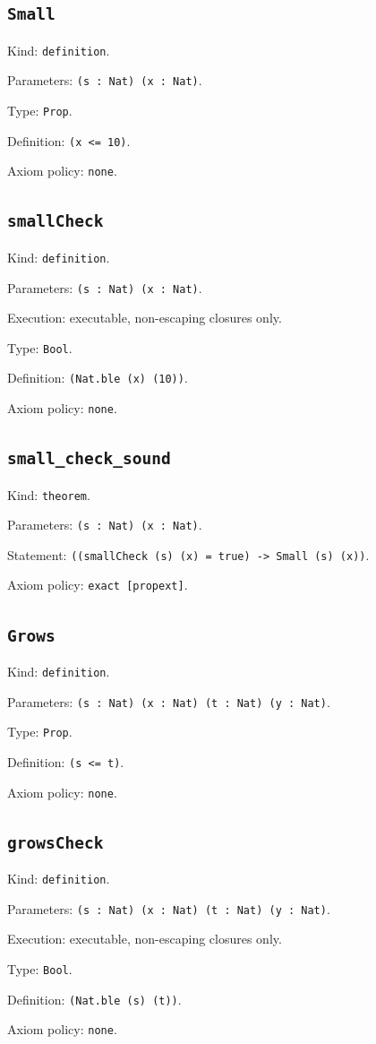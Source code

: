 \documentclass[11pt]{article}
\begin{document}
\subsection*{\texttt{Small}}
\noindent Kind: \texttt{definition}.\par
\noindent Parameters: \texttt{(s : Nat) (x : Nat)}.\par
\noindent Type: \texttt{Prop}.\par
\noindent Definition: \texttt{(x <= 10)}.\par
\noindent Axiom policy: \texttt{none}.\par
\subsection*{\texttt{smallCheck}}
\noindent Kind: \texttt{definition}.\par
\noindent Parameters: \texttt{(s : Nat) (x : Nat)}.\par
\noindent Execution: executable, non-escaping closures only.\par
\noindent Type: \texttt{Bool}.\par
\noindent Definition: \texttt{(Nat.ble (x) (10))}.\par
\noindent Axiom policy: \texttt{none}.\par
\subsection*{\texttt{small\_check\_sound}}
\noindent Kind: \texttt{theorem}.\par
\noindent Parameters: \texttt{(s : Nat) (x : Nat)}.\par
\noindent Statement: \texttt{((smallCheck (s) (x) = true) -> Small (s) (x))}.\par
\noindent Axiom policy: \texttt{exact [propext]}.\par
\subsection*{\texttt{Grows}}
\noindent Kind: \texttt{definition}.\par
\noindent Parameters: \texttt{(s : Nat) (x : Nat) (t : Nat) (y : Nat)}.\par
\noindent Type: \texttt{Prop}.\par
\noindent Definition: \texttt{(s <= t)}.\par
\noindent Axiom policy: \texttt{none}.\par
\subsection*{\texttt{growsCheck}}
\noindent Kind: \texttt{definition}.\par
\noindent Parameters: \texttt{(s : Nat) (x : Nat) (t : Nat) (y : Nat)}.\par
\noindent Execution: executable, non-escaping closures only.\par
\noindent Type: \texttt{Bool}.\par
\noindent Definition: \texttt{(Nat.ble (s) (t))}.\par
\noindent Axiom policy: \texttt{none}.\par
\end{document}
